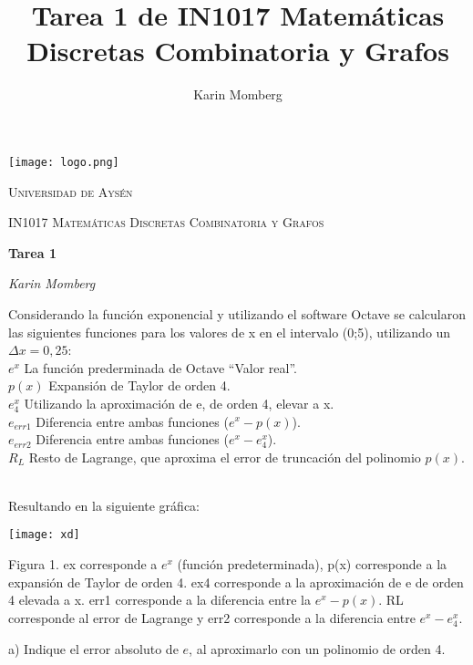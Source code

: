 \documentclass[]{article}
\title{Tarea 1 de IN1017 Matemáticas Discretas Combinatoria y Grafos}
\author{Karin Momberg}
\begin{document}
\begin{titlepage}
		\centering
		\texttt{[image: logo.png]}\par\vspace{1cm}
		{\scshape\LARGE Universidad de Aysén \par}
		\vspace{1cm}
		{\scshape\Large IN1017 Matemáticas Discretas Combinatoria y Grafos\par}
		\vspace{1.5cm}
		{\huge\bfseries Tarea 1\par}
		\vspace{2cm}
		{\Large\itshape Karin Momberg\par}
		
		\vfill
		{\large \Today\par}
	\end{titlepage}

Considerando la función exponencial y utilizando el software Octave se calcularon las siguientes funciones para los valores de x en el intervalo (0;5), utilizando un $\Delta x = 0,25$: \\
$e^{x}$ \hspace{5mm} La función prederminada de Octave “Valor real”. \\
$p(x)$ \hspace{2mm} Expansión de Taylor de orden 4. \\
$e^{x}_{4}$ \hspace{5mm} Utilizando la aproximación de e, de orden 4, elevar a x. \\
$e_{err1}$ \hspace{1mm} Diferencia entre ambas funciones ($e^{x} - p(x)$). \\
$e_{err2}$ \hspace{1mm} Diferencia entre ambas funciones ($e^{x} - e^{x}_{4}$). \\
$R_{L}$ \hspace{3mm} Resto de Lagrange, que aproxima el error de truncación del polinomio $p(x)$. \\\\

\begin{flushleft}
	Resultando en la siguiente gráfica: 
\end{flushleft}
\begin{center}
	\texttt{[image: xd]} \\ 
\end{center}
\begin{flushleft}
	Figura 1. ex corresponde a $e^{x}$ (función predeterminada), p(x) corresponde a la expansión de Taylor de orden 4. ex4 corresponde a la aproximación de e de orden 4 elevada a x. err1 corresponde a la diferencia entre la $e^{x} - p(x)$. RL corresponde al error de Lagrange y err2 corresponde a la diferencia entre $e^{x} - e^{x}_{4}$. 
\end{flushleft}
	a) Indique el error absoluto de $e$, al aproximarlo con un polinomio de orden 4. 
\end{document}

